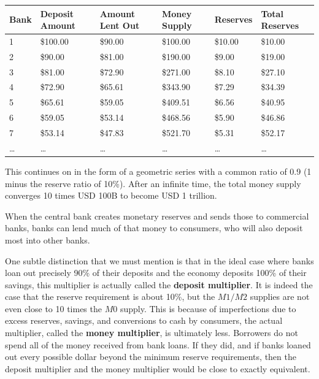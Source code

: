 \documentclass{article}
\begin{document}
\begin{example}
      \begin{tabular}{|l|l|l|l|l|l|}
        \hline
        Bank & Deposit Amount & Amount Lent Out & Money Supply & Reserves & Total Reserves \\
        \hline
        1 & \$100.00 & \$90.00 & \$100.00 & \$10.00 & \$10.00 \\
        2 & \$90.00 & \$81.00 & \$190.00 & \$9.00 & \$19.00 \\
        3 & \$81.00 & \$72.90 & \$271.00 & \$8.10 & \$27.10 \\
        4 & \$72.90 & \$65.61 & \$343.90 & \$7.29 & \$34.39 \\
        5 & \$65.61 & \$59.05 & \$409.51 & \$6.56 & \$40.95 \\
        6 & \$59.05 & \$53.14 & \$468.56 & \$5.90 & \$46.86 \\
        7 & \$53.14 & \$47.83 & \$521.70 & \$5.31 & \$52.17 \\
        \ldots & \ldots & \ldots & \ldots & \ldots & \ldots \\
        \hline
      \end{tabular}

      This continues on in the form of a geometric series with a common ratio of 0.9 (1 minus the reserve ratio of 10\%). After an infinite time, the total money supply converges 10 times USD 100B to become USD 1 trillion.
    \end{example}

    \begin{definition}
      When the central bank creates monetary reserves and sends those to commercial banks, banks can lend much of that money to consumers, who will also deposit most into other banks. 
    \end{definition}

    One subtle distinction that we must mention is that in the ideal case where banks loan out precisely 90\% of their deposits and the economy deposits 100\% of their savings, this multiplier is actually called the \textbf{deposit multiplier}. It is indeed the case that the reserve requirement is about 10\%, but the $M1/M2$ supplies are not even close to 10 times the $M0$ supply. This is because of imperfections due to excess reserves, savings, and conversions to cash by consumers, the actual multiplier, called the \textbf{money multiplier}, is ultimately less. Borrowers do not spend all of the money received from bank loans. If they did, and if banks loaned out every possible dollar beyond the minimum reserve requirements, then the deposit multiplier and the money multiplier would be close to exactly equivalent.
\end{document}
